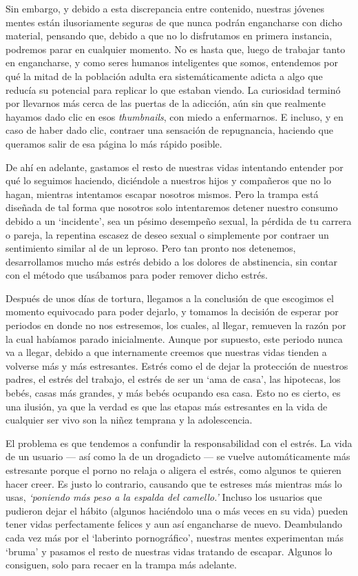 \documentclass[
  spanish,
  openany]{book}
\begin{document}
Sin embargo, y debido a esta discrepancia entre contenido, nuestras jóvenes mentes están ilusoriamente seguras de que nunca podrán engancharse con dicho material, pensando que, debido a que no lo disfrutamos en primera instancia, podremos parar en cualquier momento. No es hasta que, luego de trabajar tanto en engancharse, y como seres humanos inteligentes que somos, entendemos por qué la mitad de la población adulta era sistemáticamente adicta a algo que reducía su potencial para replicar lo que estaban viendo. La curiosidad terminó por llevarnos más cerca de las puertas de la adicción, aún sin que realmente hayamos dado clic en esos \emph{thumbnails}, con miedo a enfermarnos. E incluso, y en caso de haber dado clic, contraer una sensación de repugnancia, haciendo que queramos salir de esa página lo más rápido posible.

De ahí en adelante, gastamos el resto de nuestras vidas intentando entender por qué lo seguimos haciendo, diciéndole a nuestros hijos y compañeros que no lo hagan, mientras intentamos escapar nosotros mismos. Pero la trampa está diseñada de tal forma que nosotros solo intentaremos detener nuestro consumo debido a un `incidente', sea un pésimo desempeño sexual, la pérdida de tu carrera o pareja, la repentina escasez de deseo sexual o simplemente por contraer un sentimiento similar al de un leproso. Pero tan pronto nos detenemos, desarrollamos mucho más estrés debido a los dolores de abstinencia, sin contar con el método que usábamos para poder remover dicho estrés.

Después de unos días de tortura, llegamos a la conclusión de que escogimos el momento equivocado para poder dejarlo, y tomamos la decisión de esperar por periodos en donde no nos estresemos, los cuales, al llegar, remueven la razón por la cual habíamos parado inicialmente. Aunque por supuesto, este periodo nunca va a llegar, debido a que internamente creemos que nuestras vidas tienden a volverse más y más estresantes. Estrés como el de dejar la protección de nuestros padres, el estrés del trabajo, el estrés de ser un `ama de casa', las hipotecas, los bebés, casas más grandes, y más bebés ocupando esa casa. Esto no es cierto, es una ilusión, ya que la verdad es que las etapas más estresantes en la vida de cualquier ser vivo son la niñez temprana y la adolescencia.

El problema es que tendemos a confundir la responsabilidad con el estrés. La vida de un usuario --- así como la de un drogadicto --- se vuelve automáticamente más estresante porque el porno no relaja o aligera el estrés, como algunos te quieren hacer creer. Es justo lo contrario, causando que te estreses más mientras más lo usas, \emph{`poniendo más peso a la espalda del camello.'} Incluso los usuarios que pudieron dejar el hábito (algunos haciéndolo una o más veces en su vida) pueden tener vidas perfectamente felices y aun así engancharse de nuevo. Deambulando cada vez más por el `laberinto pornográfico', nuestras mentes experimentan más `bruma' y pasamos el resto de nuestras vidas tratando de escapar. Algunos lo consiguen, solo para recaer en la trampa más adelante.
\end{document}
